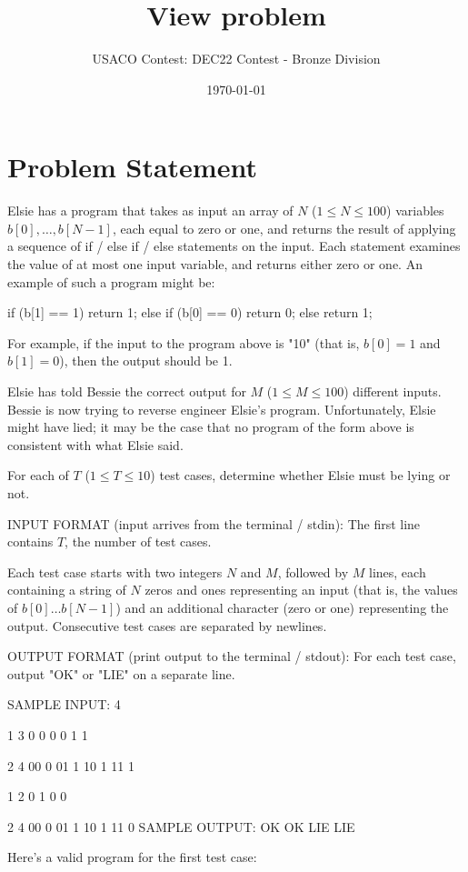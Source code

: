 \documentclass[12pt]{article}
\title{View problem}
\author{USACO Contest: DEC22 Contest - Bronze Division}
\date{\today}
\begin{document}
\maketitle

\section*{Problem Statement}

Elsie has a program that takes as input an array of $N$ ($1\le N\le 100$)
variables $b[0],\dots,b[N-1]$, each equal to zero or one,  and returns the
result of applying a sequence of if / else if / else statements on the input. 
Each statement examines the value of at most one input variable, and returns 
either zero or one.  An example of such a program might be:


if (b[1] == 1) return 1;
else if (b[0] == 0) return 0;
else return 1;

For example, if the input to the program above is "10" (that is, $b[0] = 1$ and
$b[1] = 0$), then the output should be 1.

Elsie has told Bessie the correct output for $M$ ($1\le M\le 100$) different
inputs. Bessie is now trying to reverse engineer Elsie's program. Unfortunately,
Elsie might have lied; it may be the case that no program of the form above is
consistent with what Elsie said. 

For each of $T$ ($1\le T\le 10$) test cases, determine whether Elsie must be
lying or not.

INPUT FORMAT (input arrives from the terminal / stdin):
The first line contains $T$, the number of test cases.

Each test case starts with two integers $N$ and $M$, followed by $M$ lines, each
containing a string of $N$ zeros and ones representing an input (that is, the
values of $b[0] \ldots b[N-1]$) and an additional character (zero or one)
representing the output. Consecutive test cases are separated by newlines.

OUTPUT FORMAT (print output to the terminal / stdout):
For each test case, output "OK" or "LIE" on a separate line.

SAMPLE INPUT:
4

1 3
0 0
0 0
1 1

2 4
00 0
01 1
10 1
11 1

1 2
0 1
0 0

2 4
00 0
01 1
10 1
11 0
SAMPLE OUTPUT: 
OK
OK
LIE
LIE

Here's a valid program for the first test case:
\end{document}
